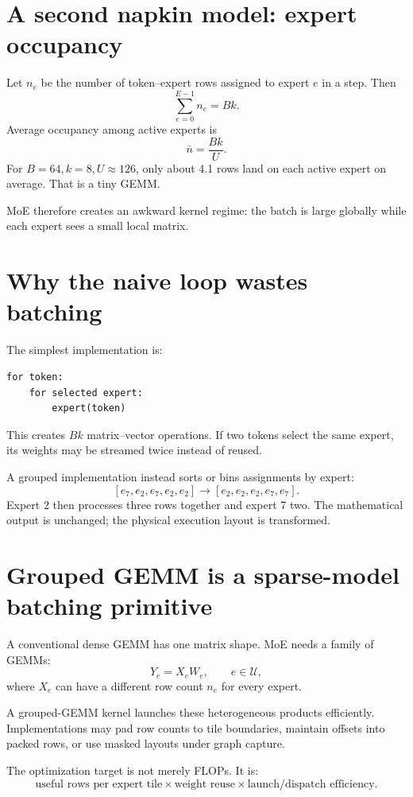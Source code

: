 \section{A second napkin model: expert occupancy}

Let $n_e$ be the number of token--expert rows assigned to expert $e$ in a step. Then
\[
\sum_{e=0}^{E-1}n_e=Bk.
\]
Average occupancy among active experts is
\[
\bar n=\frac{Bk}{U}.
\]
For $B=64,k=8,U\approx126$, only about 4.1 rows land on each active expert on average.
That is a tiny GEMM.

MoE therefore creates an awkward kernel regime: the batch is large globally while each
expert sees a small local matrix.

\section{Why the naive loop wastes batching}

The simplest implementation is:

\begin{verbatim}
for token:
    for selected expert:
        expert(token)
\end{verbatim}

This creates $Bk$ matrix--vector operations. If two tokens select the same expert, its
weights may be streamed twice instead of reused.

A grouped implementation instead sorts or bins assignments by expert:
\[
[e_7,e_2,e_7,e_2,e_2]
\longrightarrow
[e_2,e_2,e_2,e_7,e_7].
\]
Expert 2 then processes three rows together and expert 7 two. The mathematical output
is unchanged; the physical execution layout is transformed.

\section{Grouped GEMM is a sparse-model batching primitive}

A conventional dense GEMM has one matrix shape. MoE needs a family of GEMMs:
\[
Y_e=X_eW_e,\qquad e\in\mathcal{U},
\]
where $X_e$ can have a different row count $n_e$ for every expert.

A grouped-GEMM kernel launches these heterogeneous products efficiently. Implementations
may pad row counts to tile boundaries, maintain offsets into packed rows, or use masked
layouts under graph capture.

The optimization target is not merely FLOPs. It is:
\[
\text{useful rows per expert tile}
\times
\text{weight reuse}
\times
\text{launch/dispatch efficiency}.
\]


